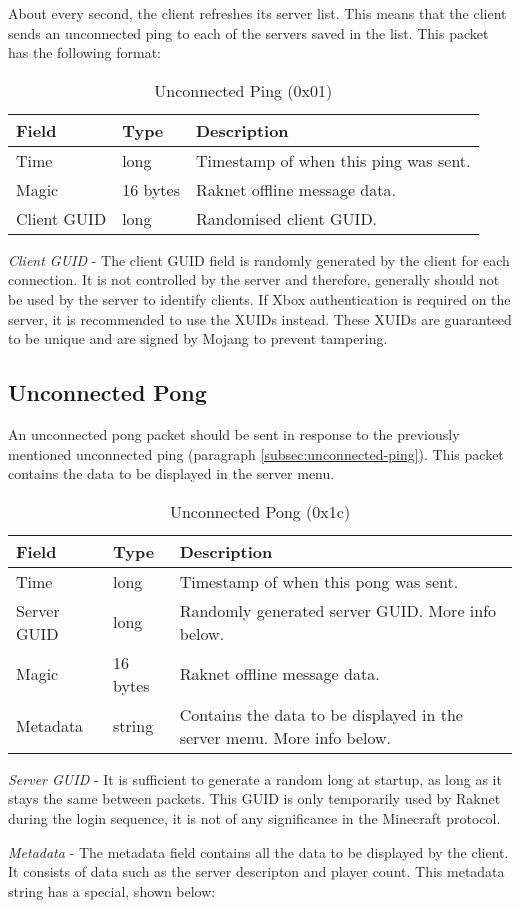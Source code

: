 \documentclass[12pt]{report}
\newcommand{\packet}[3]{
    \begin{table}[H]
        \label{tab:#1}
        \caption{#2}
        \vspace{0.25cm}
        \begin{tabularx}{\textwidth}{|l|l|X|}
            \hline
            \rowcolor{yellow}
            Field & Type & Description \\
            \hline
            #3
            \hline
        \end{tabularx}
    \end{table}
}
\begin{document}
About every second, the client refreshes its server list.
This means that the client sends an unconnected ping to each of the servers saved in the list.
This packet has the following format:

\packet{unconnected-ping}{Unconnected Ping (0x01)}{
    Time & long & Timestamp of when this ping was sent. \\
    \hline
    Magic & 16 bytes & Raknet offline message data. \\
    \hline
    Client GUID & long & Randomised client GUID. \\
}

\textit{Client GUID} - The client GUID field is randomly generated by the client for each connection.
It is not controlled by the server and therefore, generally should not be used by the server to identify clients.
If Xbox authentication is required on the server, it is recommended to use the XUIDs instead.
These XUIDs are guaranteed to be unique and are signed by Mojang to prevent tampering.

\subsection{Unconnected Pong}\label{subsec:unconnected-pong}

An unconnected pong packet should be sent in response to the previously mentioned unconnected ping (paragraph \ref{subsec:unconnected-ping}).
This packet contains the data to be displayed in the server menu.

\packet{unconnected-pong}{Unconnected Pong (0x1c)}{
    Time & long & Timestamp of when this pong was sent. \\
    \hline
    Server GUID & long & Randomly generated server GUID. More info below. \\
    \hline
    Magic & 16 bytes & Raknet offline message data. \\
    \hline
    Metadata & string & Contains the data to be displayed in the server menu. More info below. \\ 
}

\textit{Server GUID} - It is sufficient to generate a random long at startup, as long as it stays the same between packets.
This GUID is only temporarily used by Raknet during the login sequence, it is not of any significance in the Minecraft protocol.

\textit{Metadata} - The metadata field contains all the data to be displayed by the client.
It consists of data such as the server descripton and player count.
This metadata string has a special, shown below:
\end{document}
